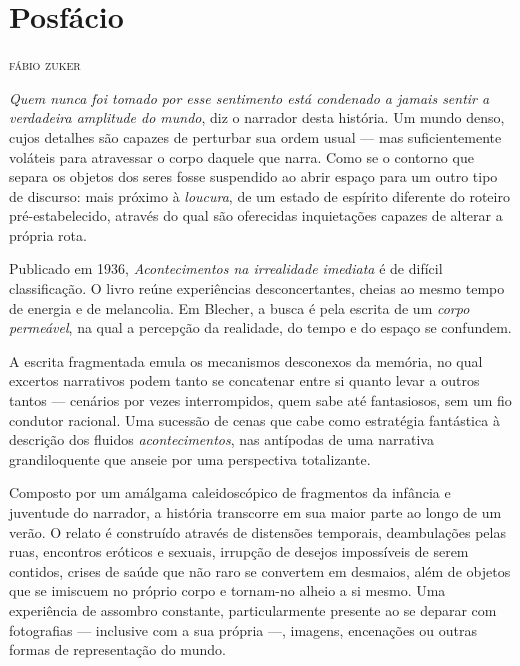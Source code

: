 \newcommand{\subtitulo}[1]{\NoCaseChange{\textnormal{\break\Large\itshape#1}}}
\chapter*{Posfácio\smallskip\subtitulo{O instável mundo de Max Blecher}}

\begin{flushright}
\textsc{fábio zuker}
\end{flushright}

\noindent\textit{Quem nunca foi tomado por esse sentimento está condenado a jamais sentir a verdadeira amplitude do mundo}, diz o narrador desta história. Um mundo  denso, cujos detalhes são capazes de perturbar sua ordem usual --- mas suficientemente voláteis para atravessar o corpo daquele que narra. Como se o contorno que separa os objetos dos seres fosse suspendido ao abrir espaço para um outro tipo de discurso: mais próximo à \textit{loucura}, de um estado de espírito diferente do roteiro pré-estabelecido, através do qual são oferecidas inquietações capazes de alterar a própria rota.

Publicado em 1936, \textit{Acontecimentos na irrealidade imediata} é de difícil classificação. O livro reúne experiências desconcertantes, cheias ao mesmo tempo de energia e de melancolia. Em Blecher, a busca é pela escrita de um \textit{corpo permeável}, na qual a percepção da realidade, do tempo e do espaço se confundem. 

A escrita fragmentada emula os mecanismos desconexos da memória, no qual excertos narrativos podem tanto se concatenar entre si quanto levar a outros tantos --- cenários por vezes interrompidos, quem sabe até fantasiosos, sem um fio condutor racional. Uma sucessão de cenas que cabe como estratégia fantástica à descrição dos fluidos \textit{acontecimentos}, nas antípodas de uma narrativa grandiloquente que anseie por uma perspectiva totalizante.

Composto por um amálgama caleidoscópico de fragmentos da infância e juventude do narrador, a história transcorre em sua maior parte ao longo de um verão. O relato é construído através de distensões temporais, deambulações pelas ruas, encontros eróticos e sexuais, irrupção de desejos impossíveis de serem contidos, crises de saúde que não raro se convertem em desmaios, além de objetos que se imiscuem no próprio corpo e tornam-no alheio a si mesmo. Uma experiência de assombro constante, particularmente presente ao se deparar com fotografias --- inclusive com a sua própria ---, imagens, encenações ou outras formas de representação do mundo.

